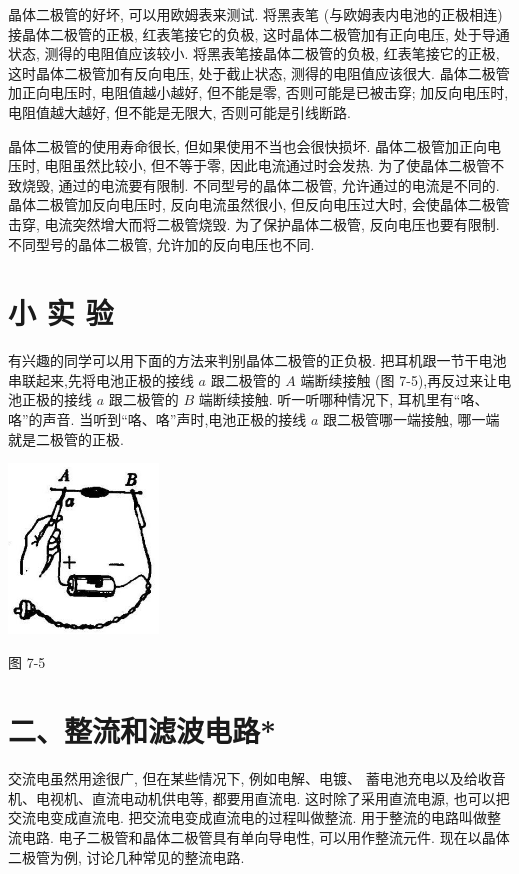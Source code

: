 \documentclass[10pt]{article}
\begin{document}
晶体二极管的好坏, 可以用欧姆表来测试. 将黑表笔 (与欧姆表内电池的正极相连) 接晶体二极管的正极, 红表笔接它的负极, 这时晶体二极管加有正向电压, 处于导通状态, 测得的电阻值应该较小. 将黑表笔接晶体二极管的负极, 红表笔接它的正极, 这时晶体二极管加有反向电压, 处于截止状态, 测得的电阻值应该很大. 晶体二极管加正向电压时, 电阻值越小越好, 但不能是零, 否则可能是已被击穿; 加反向电压时, 电阻值越大越好, 但不能是无限大, 否则可能是引线断路.

晶体二极管的使用寿命很长, 但如果使用不当也会很快损坏. 晶体二极管加正向电压时, 电阻虽然比较小, 但不等于零, 因此电流通过时会发热. 为了使晶体二极管不致烧毁, 通过的电流要有限制. 不同型号的晶体二极管, 允许通过的电流是不同的. 晶体二极管加反向电压时, 反向电流虽然很小, 但反向电压过大时, 会使晶体二极管击穿, 电流突然增大而将二极管烧毁. 为了保护晶体二极管, 反向电压也要有限制. 不同型号的晶体二极管, 允许加的反向电压也不同.

\section*{小 实 验}

有兴趣的同学可以用下面的方法来判别晶体二极管的正负极. 把耳机跟一节干电池串联起来,先将电池正极的接线 \(a\) 跟二极管的 \(A\) 端断续接触 (图 7-5),再反过来让电池正极的接线 \(a\) 跟二极管的 \(B\) 端断续接触. 听一听哪种情况下, 耳机里有“咯、咯”的声音. 当听到“咯、咯”声时,电池正极的接线 \(a\) 跟二极管哪一端接触, 哪一端就是二极管的正极.

\begin{center}
\includegraphics[max width=0.3\textwidth]{images/01913056-1f15-74d8-9184-9aab52c9d66b_224_452418.jpg}
\end{center}

图 7-5

\section*{二、整流和滤波电路*}

交流电虽然用途很广, 但在某些情况下, 例如电解、电镀、 蓄电池充电以及给收音机、电视机、直流电动机供电等, 都要用直流电. 这时除了采用直流电源, 也可以把交流电变成直流电. 把交流电变成直流电的过程叫做整流. 用于整流的电路叫做整流电路. 电子二极管和晶体二极管具有单向导电性, 可以用作整流元件. 现在以晶体二极管为例, 讨论几种常见的整流电路.
\end{document}
